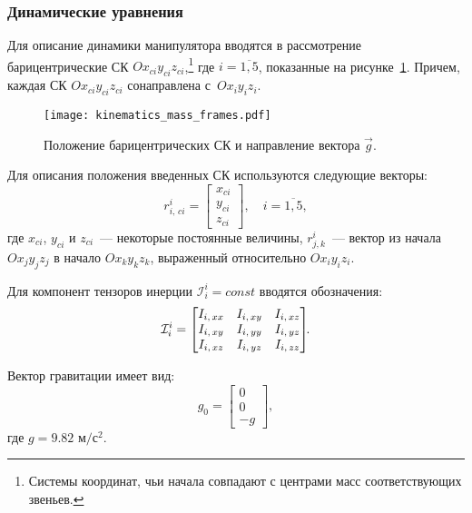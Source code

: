 \subsubsection{Динамические уравнения}

Для описание динамики манипулятора вводятся в рассмотрение барицентрические СК $Ox_{ci}y_{ci}z_{ci}$\lefteqn,\footnote{Системы координат, чьи начала совпадают с центрами масс соответствующих звеньев.} где $i=\overline{1,5}$, показанные на рисунке~\ref{img_mass_frames}.
Причем, каждая СК $Ox_{ci}y_{ci}z_{ci}$ сонаправлена с~$Ox_iy_iz_i$.

\begin{figure}[h!]
	\centering\texttt{[image: kinematics\_mass\_frames.pdf]}
	\caption{Положение барицентрических СК и направление вектора $\vec{g}$.}
	\label{img_mass_frames}
\end{figure}

Для описания положения введенных СК используются следующие векторы:
\begin{equation}
    r^i_{i,\,ci} =
    \begin{bmatrix}
        x_{ci} \\ y_{ci} \\ z_{ci}
    \end{bmatrix}\!\!,\quad i = \overline{1,5},
\end{equation}
где $x_{ci}$, $y_{ci}$ и $z_{ci}$~--- некоторые постоянные величины, $r^i_{j,k}$~--- вектор из начала $Ox_{j}y_{j}z_{j}$ в начало $Ox_{k}y_{k}z_{k}$, выраженный относительно $Ox_{i}y_{i}z_{i}$.

Для компонент тензоров инерции $\mathcal{I}^{i}_i = const$ вводятся обозначения:
\begin{equation}
    \mathcal{I}^{i}_i =
    \begin{bmatrix}
        I_{i,\,xx} & I_{i,\,xy} & I_{i,\,xz} \\
        I_{i,\,xy} & I_{i,\,yy} & I_{i,\,yz} \\
        I_{i,\,xz} & I_{i,\,yz} & I_{i,\,zz}
    \end{bmatrix}\!\!\ldotp
\end{equation}

Вектор гравитации имеет вид:
\begin{equation}
    g_0 =
    \begin{bmatrix}
        0 \\ 0 \\ -g
    \end{bmatrix}\!\!,
\end{equation}
где $g=9.82\text{ м}/\text{с}^2$.

